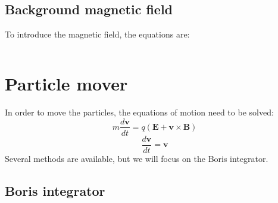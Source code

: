 \documentclass[a5paper,12pt,landscape]{report}
\newcommand*\V[1]{\bm{#1}}
\newcommand{\E}{\V{E}}
\newcommand{\B}{\V{B}}
\renewcommand*{\v}{\V{v}}
\begin{document}
\subsection{Background magnetic field}

To introduce the magnetic field, the equations are:

$$ $$

\section{Particle mover}

In order to move the particles, the equations of motion need to be solved:
%
\begin{equation}
m \frac{d\v}{dt} = q (\E + \v \times \B)
\end{equation}
\begin{equation}
\frac{d\v}{dt}=\v
\end{equation}
%
Several methods are available, but we will focus on the Boris integrator.

\subsection{Boris integrator}
\end{document}
